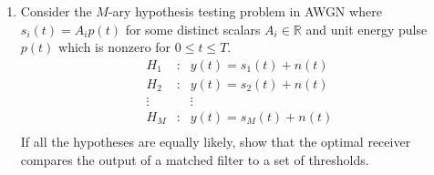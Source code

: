 \documentclass[10pt]{report}
\begin{document}
\begin{enumerate}
\begin{figure}[h]
    \end{figure}
  \item Consider the $M$-ary hypothesis testing problem in AWGN where $s_i(t) = A_ip(t)$ for some distinct scalars $A_i \in \mathbb{R}$ and unit energy pulse $p(t)$ which is nonzero for $0 \leq t \leq T$.
    \begin{equation*}
      \begin{array}{ccc}
          H_1 & : & y(t) = s_1(t) + n(t) \\
          H_2 & : & y(t) = s_2(t) + n(t) \\
          \vdots &   &  \vdots          \\
          H_M & : & y(t) = s_M(t) + n(t) \\
      \end{array}
    \end{equation*}
  If all the hypotheses are equally likely, show that the optimal receiver compares the output of a matched filter to a set of thresholds.
\end{enumerate}
\end{document}

